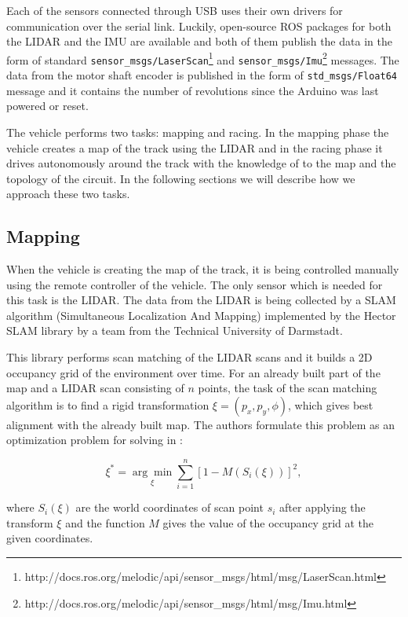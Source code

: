 Each of the sensors connected through USB uses their own drivers for communication over the serial link. Luckily, open-source \gls*{ROS} packages for both the \gls*{LIDAR} and the \gls*{IMU} are available and both of them publish the data in the form of standard \verb|sensor_msgs/LaserScan|\footnote{http://docs.ros.org/melodic/api/sensor\_msgs/html/msg/LaserScan.html} and \verb|sensor_msgs/Imu|\footnote{http://docs.ros.org/melodic/api/sensor\_msgs/html/msg/Imu.html} messages. The data from the motor shaft encoder is published in the form of \verb|std_msgs/Float64| message and it contains the number of revolutions since the Arduino was last powered or reset.

The vehicle performs two tasks: mapping and racing. In the mapping phase the vehicle creates a map of the track using the \gls*{LIDAR} and in the racing phase it drives autonomously around the track with the knowledge of to the map and the topology of the circuit. In the following sections we will describe how we approach these two tasks.

\subsection{Mapping}

When the vehicle is creating the map of the track, it is being controlled manually using the remote controller of the vehicle. The only sensor which is needed for this task is the \gls*{LIDAR}. The data from the \gls*{LIDAR} is being collected by a \gls{SLAM} algorithm (Simultaneous Localization And Mapping) implemented by the Hector \gls*{SLAM} library by a team from the Technical University of Darmstadt.

This library performs scan matching of the \gls*{LIDAR} scans and it builds a 2D occupancy grid of the environment over time. For an already built part of the map and a \gls*{LIDAR} scan consisting of $n$ points, the task of the scan matching algorithm is to find a rigid transformation $\xi =\left( p_x, p_y, \phi\right)$, which gives best alignment with the already built map. The authors formulate this problem as an optimization problem for solving in \cite{HectorSlam}:

$$
\xi^* = \underset{\xi}{\arg\min} \sum_{i=1}^n\left[ 1 - M\left( S_i\left( \xi\right)\right)\right]^2,
$$

where $S_i\left(\xi\right)$ are the world coordinates of scan point $s_i$ after applying the transform $\xi$ and the function $M$ gives the value of the occupancy grid at the given coordinates.

